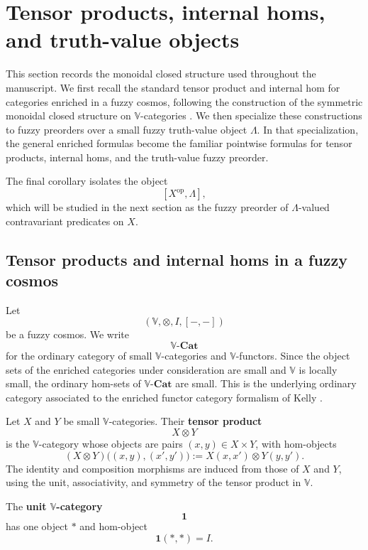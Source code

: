 \section{Tensor products, internal homs, and truth-value objects}
\label{sec:tensor-products-internal-homs-and-the-truth-value-object}

This section records the monoidal closed structure used throughout the manuscript. We first recall the standard tensor product and internal hom for categories enriched in a fuzzy cosmos, following the construction of the symmetric monoidal closed structure on \(\mathbb V\)-categories \cite[Section~1.4 and Sections~2.2--2.3]{Kelly1982BasicConcepts}. We then specialize these constructions to fuzzy preorders over a small fuzzy truth-value object \(\Lambda\). In that specialization, the general enriched formulas become the familiar pointwise formulas for tensor products, internal homs, and the truth-value fuzzy preorder.

The final corollary isolates the object
\[
    [X^{\mathrm{op}},\Lambda],
\]
which will be studied in the next section as the fuzzy preorder of \(\Lambda\)-valued contravariant predicates on \(X\).

\subsection{Tensor products and internal homs in a fuzzy cosmos}
\label{subsec:tensor-products-and-internal-homs-in-a-fuzzy-cosmos}

Let
\[
    (\mathbb V,\otimes,I,[-,-])
\]
be a fuzzy cosmos. We write
\[
    \mathbb V\text{-}\mathbf{Cat}
\]
for the ordinary category of small \(\mathbb V\)-categories and \(\mathbb V\)-functors. Since the object sets of the enriched categories under consideration are small and \(\mathbb V\) is locally small, the ordinary hom-sets of \(\mathbb V\text{-}\mathbf{Cat}\) are small. This is the underlying ordinary category associated to the enriched functor category formalism of Kelly \cite[Section~2.2, especially formula~(2.16)]{Kelly1982BasicConcepts}.

\begin{definition}
\label{def:v-tensor-product-and-unit}
    Let \(X\) and \(Y\) be small \(\mathbb V\)-categories. Their \textbf{tensor product}
    \[
        X\otimes Y
    \]
    is the \(\mathbb V\)-category whose objects are pairs \((x,y)\in X\times Y\), with hom-objects
    \[
        (X\otimes Y)\bigl((x,y),(x',y')\bigr)
        :=
        X(x,x')\otimes Y(y,y').
    \]
    The identity and composition morphisms are induced from those of \(X\) and \(Y\), using the unit, associativity, and symmetry of the tensor product in \(\mathbb V\).

    The \textbf{unit \(\mathbb V\)-category}
    \[
        \mathbf 1
    \]
    has one object \(\ast\) and hom-object
    \[
        \mathbf 1(\ast,\ast)=I.
    \]
\end{definition}

